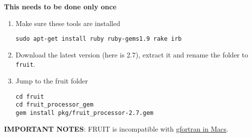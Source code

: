 {\bf This needs to be done only once}
\begin{enumerate}

\item Make sure these tools are installed
\begin{verbatim}
sudo apt-get install ruby ruby-gems1.9 rake irb
\end{verbatim}

\item Download the latest version (here is 2.7), extract it and rename
  the folder to \verb!fruit!. 

\item Jump to the fruit folder
\begin{verbatim}
cd fruit
cd fruit_processor_gem
gem install pkg/fruit_processor-2.7.gem 
\end{verbatim}

\end{enumerate}
{\bf IMPORTANT NOTES}: FRUIT is incompatible with
  \href{https://agora.cs.illinois.edu/display/cs427fa08/Unit+Testing+with+FRUIT}{gfortran
    in Macs}.

